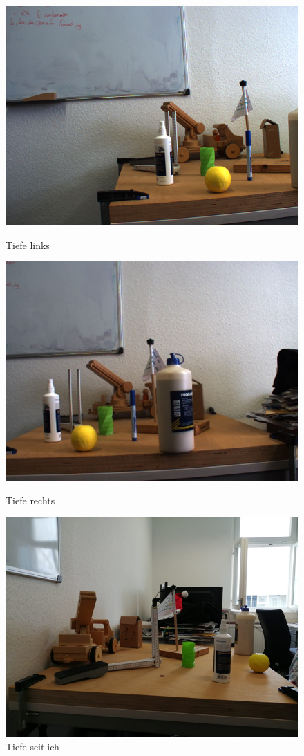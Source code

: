 \begin{figure}[!htb]
	\includegraphics[width=\linewidth]{bilder/depth_left}
	\caption{Tiefe links}\label{fig:depthleft}
	\endminipage\hfill
	\includegraphics[width=\linewidth]{bilder/depth_right}
	\caption{Tiefe rechts}\label{fig:depthright}
	\endminipage\hfill
	\includegraphics[width=\linewidth]{bilder/depth_side}
	\caption{Tiefe seitlich}\label{fig:depthside}
	\endminipage
\end{figure}

